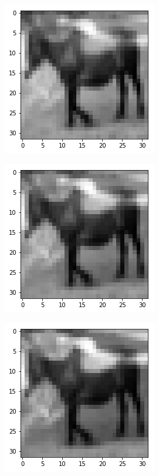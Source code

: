 \begin{figure}[H]
\bigskip
\begin{subfigure}{.3\linewidth}
    \centering
    \includegraphics[scale=0.4]{chapter_3_figures/interp5.png}
\end{subfigure}
    \hfill
\begin{subfigure}{.3\linewidth}
    \centering
    \includegraphics[scale=0.4]{chapter_3_figures/interp6.png}
\end{subfigure}
   \hfill
\begin{subfigure}{.3\linewidth}
    \centering
    \includegraphics[scale=0.4]{chapter_3_figures/interp7.png}

\end{subfigure}
\end{figure}
